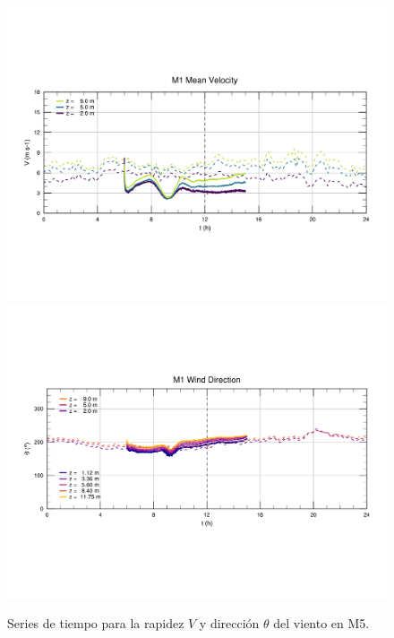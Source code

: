 \begin{figure}[H]
	\centering
	\includegraphics[width=0.87\linewidth,page=5,trim={9mm 57mm 10mm 60mm},clip]{Imagenes/06/bol/ts_interpol_compare.pdf}\\%
	\includegraphics[width=0.87\linewidth,page=5,trim={12mm 52mm 10mm 60mm},clip]{Imagenes/06/bol/ts_interpol_compare_o.pdf}%
	\vspace{-2mm}\caption{Series de tiempo para la rapidez $V$ y dirección $\theta$ del viento en M5.}
	\label{fig:06_bol_ts_m5}
\end{figure}
\vspace*{\fill}
